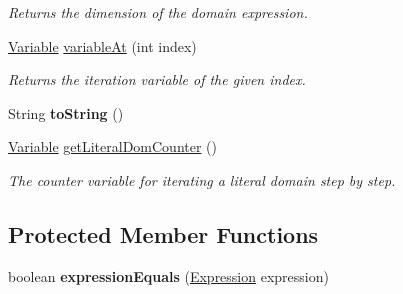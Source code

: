 \begin{DoxyCompactItemize}
\begin{DoxyCompactList}\small\item\em Returns the dimension of the domain expression. \end{DoxyCompactList}\item 
\hyperlink{interfaceedu_1_1udel_1_1cis_1_1vsl_1_1civl_1_1model_1_1IF_1_1variable_1_1Variable}{Variable} \hyperlink{classedu_1_1udel_1_1cis_1_1vsl_1_1civl_1_1model_1_1common_1_1expression_1_1CommonDomainGuardExpression_a00a316cf1a1ff29d85e1198fe21f894a}{variable\+At} (int index)
\begin{DoxyCompactList}\small\item\em Returns the iteration variable of the given index. \end{DoxyCompactList}\item 
\hypertarget{classedu_1_1udel_1_1cis_1_1vsl_1_1civl_1_1model_1_1common_1_1expression_1_1CommonDomainGuardExpression_aed02595c1b9f385d9fffc3af91a16d1a}{}String {\bfseries to\+String} ()\label{classedu_1_1udel_1_1cis_1_1vsl_1_1civl_1_1model_1_1common_1_1expression_1_1CommonDomainGuardExpression_aed02595c1b9f385d9fffc3af91a16d1a}

\item 
\hyperlink{interfaceedu_1_1udel_1_1cis_1_1vsl_1_1civl_1_1model_1_1IF_1_1variable_1_1Variable}{Variable} \hyperlink{classedu_1_1udel_1_1cis_1_1vsl_1_1civl_1_1model_1_1common_1_1expression_1_1CommonDomainGuardExpression_ad52fb2ed0b6a08396cdf3118f41c0c3a}{get\+Literal\+Dom\+Counter} ()
\begin{DoxyCompactList}\small\item\em The counter variable for iterating a literal domain step by step. \end{DoxyCompactList}\end{DoxyCompactItemize}
\subsection*{Protected Member Functions}
\begin{DoxyCompactItemize}
\item 
\hypertarget{classedu_1_1udel_1_1cis_1_1vsl_1_1civl_1_1model_1_1common_1_1expression_1_1CommonDomainGuardExpression_a117927619132601645b0ecac13b40f7b}{}boolean {\bfseries expression\+Equals} (\hyperlink{interfaceedu_1_1udel_1_1cis_1_1vsl_1_1civl_1_1model_1_1IF_1_1expression_1_1Expression}{Expression} expression)\label{classedu_1_1udel_1_1cis_1_1vsl_1_1civl_1_1model_1_1common_1_1expression_1_1CommonDomainGuardExpression_a117927619132601645b0ecac13b40f7b}

\end{DoxyCompactItemize}
